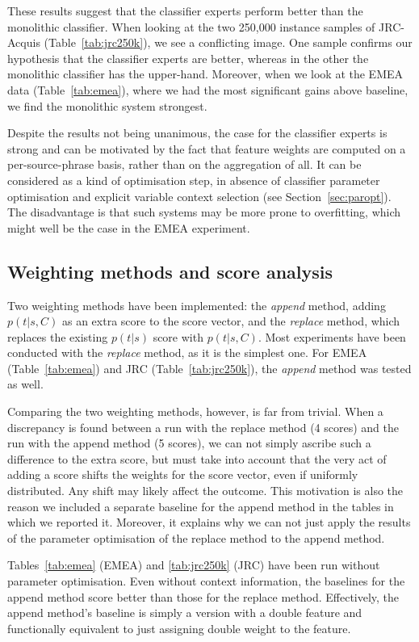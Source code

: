 \documentclass[smallextended]{svjour3}       %
\theoremstyle{break}
\begin{document}
These results suggest that the classifier experts perform better than the
monolithic classifier. When looking at the two 250,000 instance samples of
JRC-Acquis (Table~\ref{tab:jrc250k}), we see a conflicting image. One sample
confirms our hypothesis that the classifier experts are better, whereas in the
other the monolithic classifier has the upper-hand. Moreover, when we look at
the EMEA data (Table~\ref{tab:emea}), where we had the most significant gains
above baseline, we find the monolithic system strongest. 

Despite the results not being unanimous, the case for the classifier experts is
strong and can be motivated by the fact that feature weights are computed on a
per-source-phrase basis, rather than on the aggregation of all. It can be
considered as a kind of optimisation step, in absence of classifier parameter
optimisation and explicit variable context selection (see Section~\ref{sec:paropt}). The
disadvantage is that such systems may be more prone to overfitting, which might
well be the case in the EMEA experiment.


\subsection{Weighting methods and score analysis}
\label{sec:weighting}

Two weighting methods have been implemented: the \emph{append} method, adding
$p(t|s,C)$ as an extra score to the score vector, and the \emph{replace}
method, which replaces the existing $p(t|s)$ score with $p(t|s,C)$. Most
experiments have been conducted with the \emph{replace} method, as it is the
simplest one. For EMEA (Table~\ref{tab:emea}) and JRC
(Table~\ref{tab:jrc250k}), the \emph{append} method was tested as well.

Comparing the two weighting methods, however, is far from trivial. When a
discrepancy is found between a run with the replace method (4 scores) and the
run with the append method (5 scores), we can not simply ascribe such a
difference to the extra score, but must take into account that the very act of
adding a score shifts the weights for the score vector, even if uniformly
distributed. Any shift may likely affect the outcome. This
motivation is also the reason we included a separate baseline for the append
method in the tables in which we reported it. Moreover, it explains why we can
not just apply the results of the parameter optimisation of the replace method
to the append method.

Tables~\ref{tab:emea} (EMEA) and \ref{tab:jrc250k} (JRC) have been run without
parameter optimisation. Even without context information, the baselines for the
append method score better than those for the replace method. Effectively, the
append method's baseline is simply a version with a double feature and
functionally equivalent to just assigning double weight to the feature.
\end{document}
